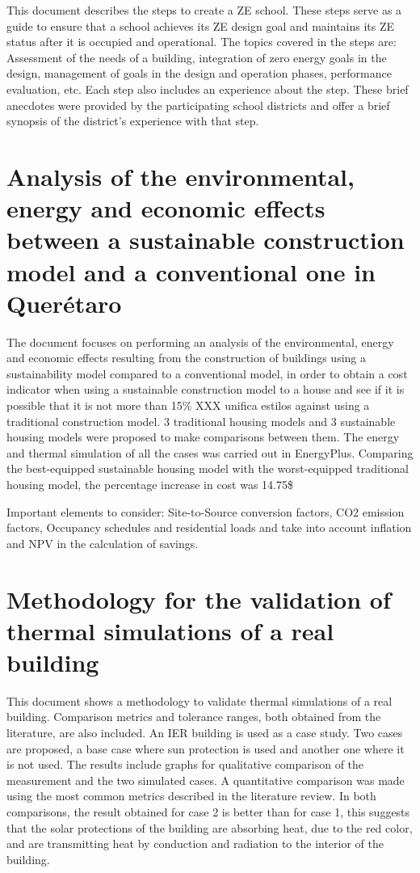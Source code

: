 This document describes the steps to create a ZE school. These steps serve as a guide to ensure that a school achieves its ZE design goal and maintains its ZE status after it is occupied and operational. The topics covered in the steps are: Assessment of the needs of a building, integration of zero energy goals in the design, management of goals in the design and operation phases, performance evaluation, etc. Each step also includes an experience about the step. These brief anecdotes were provided by the participating school districts and offer a brief synopsis of the district's experience with that step.


\section{Analysis of the environmental, energy and economic effects between a sustainable construction model and a conventional one in Querétaro}

The document focuses on performing an analysis of the environmental, energy and economic effects resulting from the construction of buildings using a sustainability model compared to a conventional model, in order to obtain a cost indicator when using a sustainable construction model to a house and see if it is possible that it is not more than 15$\%$ XXX unifica estilos  against using a traditional construction model. 3 traditional housing models and 3 sustainable housing models were proposed to make comparisons between them. The energy and thermal simulation of all the cases was carried out in EnergyPlus. Comparing the best-equipped sustainable housing model with the worst-equipped traditional housing model, the percentage increase in cost was 14.75\$%

Important elements to consider: Site-to-Source conversion factors, CO2 emission factors, Occupancy schedules and residential loads and take into account inflation and NPV in the calculation of savings.

\section{Methodology for the validation of thermal simulations of a real building}

This document shows a methodology to validate thermal simulations of a real building. Comparison metrics and tolerance ranges, both obtained from the literature, are also included. An IER building is used as a case study. Two cases are proposed, a base case where sun protection is used and another one where it is not used. The results include graphs for qualitative comparison of the measurement and the two simulated cases. A quantitative comparison was made using the most common metrics described in the literature review. In both comparisons, the result obtained for case 2 is better than for case 1, this suggests that the solar protections of the building are absorbing heat, due to the red color, and are transmitting heat by conduction and radiation to the interior of the building.



